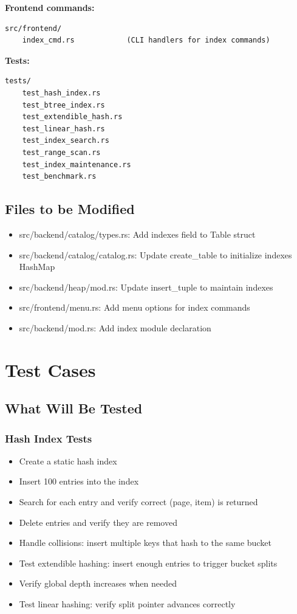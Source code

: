 \documentclass[11pt,a4paper]{article}
\begin{document}
\textbf{Frontend commands:}
\begin{lstlisting}
src/frontend/
    index_cmd.rs            (CLI handlers for index commands)
\end{lstlisting}

\textbf{Tests:}
\begin{lstlisting}
tests/
    test_hash_index.rs
    test_btree_index.rs
    test_extendible_hash.rs
    test_linear_hash.rs
    test_index_search.rs
    test_range_scan.rs
    test_index_maintenance.rs
    test_benchmark.rs
\end{lstlisting}

\subsection{Files to be Modified}

\begin{itemize}
\item src/backend/catalog/types.rs: Add indexes field to Table struct
\item src/backend/catalog/catalog.rs: Update create\_table to initialize indexes HashMap
\item src/backend/heap/mod.rs: Update insert\_tuple to maintain indexes
\item src/frontend/menu.rs: Add menu options for index commands
\item src/backend/mod.rs: Add index module declaration
\end{itemize}

\section{Test Cases}

\subsection{What Will Be Tested}

\subsubsection{Hash Index Tests}

\begin{itemize}
\item Create a static hash index
\item Insert 100 entries into the index
\item Search for each entry and verify correct (page, item) is returned
\item Delete entries and verify they are removed
\item Handle collisions: insert multiple keys that hash to the same bucket
\item Test extendible hashing: insert enough entries to trigger bucket splits
\item Verify global depth increases when needed
\item Test linear hashing: verify split pointer advances correctly
\end{itemize}
\end{document}
